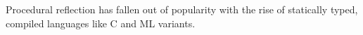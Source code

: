 Procedural reflection has fallen out of popularity with the rise of statically typed, compiled languages like C and ML variants.
